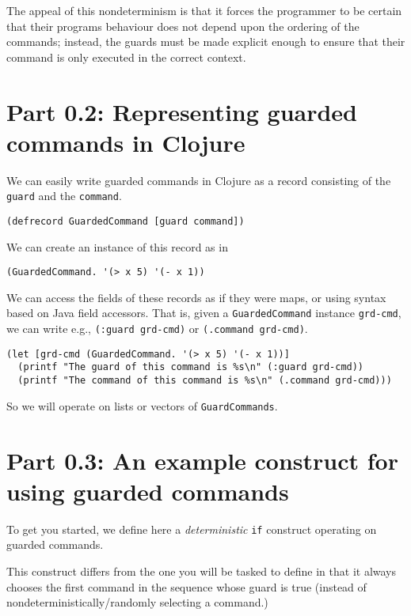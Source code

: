 \documentclass[11pt]{article}
\begin{document}
The appeal of this nondeterminism is that it forces the programmer
to be certain that their programs behaviour does not depend
upon the ordering of the commands;
instead, the guards must be made explicit enough
to ensure that their command is only executed in the correct context.

\section*{Part 0.2: Representing guarded commands in Clojure}
\label{sec:orge6793cb}
We can easily write guarded commands in Clojure
as a record consisting of the \texttt{guard} and the \texttt{command}.
\begin{verbatim}
(defrecord GuardedCommand [guard command])
\end{verbatim}

We can create an instance of this record as in
\begin{verbatim}
(GuardedCommand. '(> x 5) '(- x 1))
\end{verbatim}

We can access the fields of these records as if they were maps,
or using syntax based on Java field accessors.
That is, given a \texttt{GuardedCommand} instance \texttt{grd-cmd},
we can write e.g., \texttt{(:guard grd-cmd)} or \texttt{(.command grd-cmd)}.
\begin{verbatim}
(let [grd-cmd (GuardedCommand. '(> x 5) '(- x 1))]
  (printf "The guard of this command is %s\n" (:guard grd-cmd))
  (printf "The command of this command is %s\n" (.command grd-cmd)))
\end{verbatim}

So we will operate on lists or vectors of \texttt{GuardCommands}.

\section*{Part 0.3: An example construct for using guarded commands}
\label{sec:org61256ce}
To get you started, we define here a \emph{deterministic} \texttt{if} construct
operating on guarded commands.

This construct differs from the one you will be tasked to define
in that it always chooses the first command in the sequence
whose guard is true
(instead of nondeterministically/randomly selecting a command.)
\end{document}
